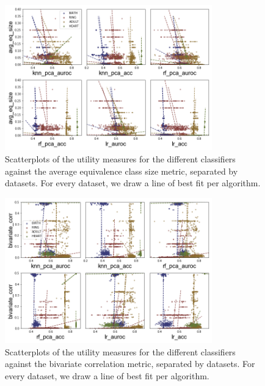 \begin{figure}[!ht]
    \centering
    \includegraphics[width=0.8\textwidth]{project/fig/scatter_sep_trends/avg_eq_size_scatter.png}
    \caption{Scatterplots of the utility measures for the different classifiers against the average equivalence class size metric, separated by datasets. For every dataset, we draw a line of best fit per algorithm.}
\end{figure}

\begin{figure}[!ht]
    \centering
    \includegraphics[width=0.8\textwidth]{project/fig/scatter_sep_trends/bivariate_corr_scatter.png}
    \caption{Scatterplots of the utility measures for the different classifiers against the bivariate correlation metric, separated by datasets. For every dataset, we draw a line of best fit per algorithm.}
\end{figure}

